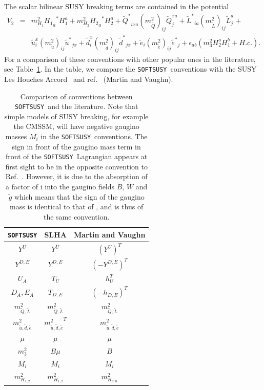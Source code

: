 \documentclass{article}
\def\SOFTSUSY{{\tt SOFTSUSY}}
\begin{document}
The scalar bilinear SUSY breaking terms are contained in the potential
\begin{eqnarray}
V_2 &=& m_{H_1}^2 {{H_1}_a}^* {H_1^a} + m_{H_2}^2 {{H_2}_a}^* {H_2^a} +
{\tilde{Q}^*}_{ixa} (m_{\tilde Q}^2)_{ij} \tilde{Q}_j^{xa} +
{\tilde{L}^*}_{ia} (m_{\tilde L}^2)_{ij} \tilde{L}_j^{a}  + \nonumber \\ &&
 \tilde{u}_i^{x} (m_{\tilde u}^2)_{ij}  {\tilde{u}^*}_{jx} +
\tilde{d}_i^{x} (m_{\tilde d}^2)_{ij}  {\tilde{d}^*}_{jx} +
\tilde{e}_i (m_{\tilde e}^2)_{ij} {\tilde{e}^*}_{j} +
\epsilon_{ab} (m_3^2 H_2^a H_1^b + H.c.).
\end{eqnarray}
For a comparison of these conventions with other popular ones in the
literature, see Table~\ref{tab:conv}. In the table, we compare the
\SOFTSUSY~conventions with the 
SUSY Les Houches Accord~\cite{lhacc} and ref.~\cite{mandv} (Martin and Vaughn).
%
\begin{table}\begin{center}
\begin{tabular}{ccc}
\SOFTSUSY & SLHA & Martin and Vaughn \\ \hline
$Y^{U}$ & $Y^{U}$ & $({Y^{U}})^T$ \\
$Y^{D,E}$ & $Y^{D,E}$ & $(-{Y^{D,E}})^T$ \\
$U_A$ & $T_{U}$ & $h_{U}^T$ \\
$D_A, E_A$ & $T_{D,E}$ & $(-h_{D,E})^T$ \\
$m_{{\tilde Q},{\tilde L}}^2$ & $m_{{\tilde Q},{\tilde L}}^2$ & $m_{{\tilde
    Q},{\tilde L}}^2$ \\
$m_{{\tilde u},{\tilde d},{\tilde e}}^2$ & ${m_{{\tilde u},{\tilde d},{\tilde
    e}}^2}^T$ &
$m_{{\tilde u},{\tilde d},{\tilde e}}^2$\\
$\mu$ & $\mu$ & $\mu$ \\
$m_3^2$ & $B \mu$ & $B$  \\
$M_i$ & $M_i$ & $M_i$ \\
$m_{H_{1,2}}^2$ & $m_{H_{1,2}}^2$& $m_{H_{d,u}}^2$ \\
\end{tabular}
\caption{\label{tab:conv} Comparison of conventions between \SOFTSUSY~and the literature. Note
  that simple models of SUSY breaking, for example the CMSSM, will have
  negative gaugino masses $M_i$ in the
  \SOFTSUSY~conventions. The sign in front of the gaugino mass
    term in front of the \SOFTSUSY~Lagrangian appears at first sight to be in
    the     opposite convention 
    to Ref.~\cite{mandv}. However, it is due to the absorption of a factor of
    i into the gaugino fields $\tilde B$, $\tilde W$ and $\tilde g$ which
    means that the sign of the gaugino mass is identical to that of
    \cite{mandv}, and is thus of the same convention.}
\end{center}\end{table}
\end{document}
